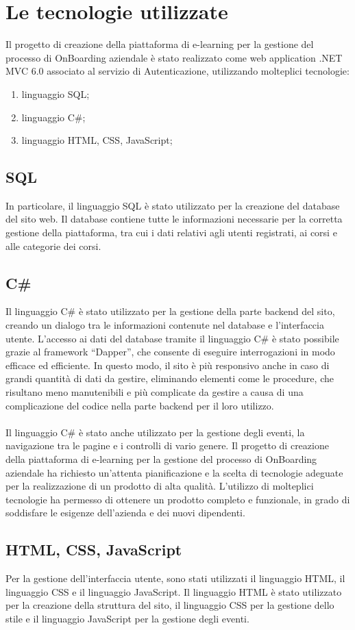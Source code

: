 \chapter{Le tecnologie utilizzate}\label{chapter:formattazione}
%
Il progetto di creazione della piattaforma di e-learning per la gestione del processo di 
OnBoarding aziendale è stato realizzato come web application .NET MVC 6.0 associato al servizio di Autenticazione,
utilizzando molteplici tecnologie:
%
\begin{enumerate}
    \item linguaggio SQL;
    \item linguaggio C\#;
    \item linguaggio HTML, CSS, JavaScript;
\end{enumerate}
%
\section{SQL}\label{sec:cap_sec_subsec}
In particolare, il linguaggio SQL è stato utilizzato per 
la creazione del database del sito web. Il database contiene tutte le informazioni 
necessarie per la corretta gestione della piattaforma, tra cui i dati relativi agli utenti 
registrati, ai corsi e alle categorie dei corsi.
%
\section{C\#}\label{sec:cap_sec_subsec}
Il linguaggio C\# è stato utilizzato per la gestione della parte backend del sito, 
creando un dialogo tra le informazioni contenute nel database e l'interfaccia utente. 
L'accesso ai dati del database tramite il linguaggio C\# è stato possibile grazie 
al framework ``Dapper'', che consente di eseguire interrogazioni in modo efficace ed 
efficiente. In questo modo, il sito è più responsivo anche in caso di grandi quantità di 
dati da gestire, eliminando elementi come le procedure, che risultano meno 
manutenibili e più complicate da gestire a causa di una complicazione del codice nella 
parte backend per il loro utilizzo. 
\\ \\
Il linguaggio C\# è stato anche utilizzato per la 
gestione degli eventi, la navigazione tra le pagine e i controlli di vario genere.
Il progetto di creazione della piattaforma di e-learning per la gestione del processo di 
OnBoarding aziendale ha richiesto un'attenta pianificazione e la scelta di tecnologie 
adeguate per la realizzazione di un prodotto di alta qualità. L'utilizzo di molteplici 
tecnologie ha permesso di ottenere un prodotto completo e funzionale, in grado di 
soddisfare le esigenze dell'azienda e dei nuovi dipendenti.
%
\section{HTML, CSS, JavaScript}\label{sec:cap_sec_subsec}
Per la gestione dell'interfaccia utente, sono stati utilizzati il linguaggio HTML, il 
linguaggio CSS e il linguaggio JavaScript. Il linguaggio HTML è stato utilizzato per la 
creazione della struttura del sito, il linguaggio CSS per la gestione dello stile e il 
linguaggio JavaScript per la gestione degli eventi.